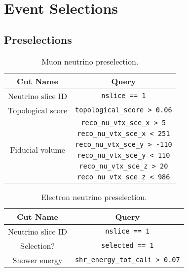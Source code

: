 \section{Event Selections}

\subsection{Preselections}
\label{appendix:Preselections}

\renewcommand{\arraystretch}{1.4}
\begin{table}[H]
    \centering
    \begin{tabular}{c|c}
        \hline
        \hline
        Cut Name & Query \\
        \hline
        \hline
        Neutrino slice ID & \verb|nslice == 1|  \\
        \hline
        Topological score & \verb|topological_score > 0.06| \\
        \hline
        \multirow{6}{*}{Fiducial volume} & \verb|reco_nu_vtx_sce_x > 5| \\
        & \verb|reco_nu_vtx_sce_x < 251| \\
        & \verb|reco_nu_vtx_sce_y > -110| \\
        & \verb|reco_nu_vtx_sce_y < 110| \\
        & \verb|reco_nu_vtx_sce_z > 20| \\
        & \verb|reco_nu_vtx_sce_z < 986| \\
        \hline
        \end{tabular}
    \caption{Muon neutrino preselection.}
    \label{tab:NuMuPresel}    
\end{table}
\renewcommand{\arraystretch}{1.0}

\renewcommand{\arraystretch}{1.4}
\begin{table}[H]
    \centering
    \begin{tabular}{c|c}
        \hline
        \hline
        Cut Name & Query \\
        \hline
        \hline
        Neutrino slice ID & \verb|nslice == 1|  \\
        \hline
        Selection? & \verb|selected == 1| \\
        \hline
        Shower energy & \verb|shr_energy_tot_cali > 0.07| \\
        \hline
        \end{tabular}
    \caption{Electron neutrino preselection.}
    \label{tab:NuMuPresel}    
\end{table}
\renewcommand{\arraystretch}{1.0}

